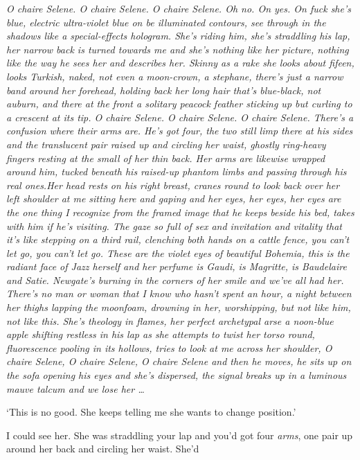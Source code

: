 \documentclass[
]{article}
\begin{document}
 \emph{O chaire Selene. O chaire Selene. O chaire Selene. Oh no.
On yes. On fuck she's blue, electric ultra-violet blue on be illuminated
contours, see through in the shadows like a special-effects hologram.
She's riding him, she's straddling his lap, her narrow back is turned
towards me and she's nothing like her picture, nothing like the way he
sees her and describes her. Skinny as a rake she looks about fifeen,
looks Turkish, naked, not even a moon-crown, a stephane, there's just a
narrow band around her forehead, holding back her long hair that's
blue-black, not auburn, and there at the front a solitary peacock
feather sticking up but curling to a crescent at its tip. O chaire
Selene. O chaire Selene. O chaire Selene. There's a confusion where
their arms are. He's got four, the two still limp there at his sides and
the translucent pair raised up and circling her waist, ghostly
ring-heavy fingers resting at the small of her thin back. Her arms are
likewise wrapped around him, tucked beneath his raised-up phantom limbs
and passing through his real ones.Her head rests on his right breast,
cranes round to look back over her left shoulder at me sitting here and
gaping and her eyes, her eyes, her eyes are the one thing I recognize
from the framed image that he keeps beside his bed, takes with him if
he's visiting. The gaze so full of sex and invitation and vitality that
it's like stepping on a third rail, clenching both hands on a cattle
fence, you can't let go, you can't let go. These are the violet eyes of
beautiful Bohemia, this is the radiant face of Jazz herself and her
perfume is Gaudi, is Magritte, is Baudelaire and Satie. Newgate's
burning in the corners of her smile and we've all had her. There's no
man or woman that I know who hasn't spent an hour, a night between her
thighs lapping the moonfoam, drowning in her, worshipping, but not like
him, not like this. She's theology in flames, her perfect archetypal
arse a noon-blue apple shifting restless in his lap as she attempts to
twist her torso round, fluorescence pooling in its hollows, tries to
look at me across her shoulder, O chaire Selene, O chaire Selene, O
chaire Selene and then he moves, he sits up on the sofa opening his eyes
and she's dispersed, the signal breaks up in a luminous mauve talcum and
we lose her \ldots{}} \par
`This is no good. She keeps telling me she wants to change
position.' \par
I could see her. She was straddling your lap and you'd got four
\emph{arms}, one pair up around her back and circling her waist. She'd
\end{document}
